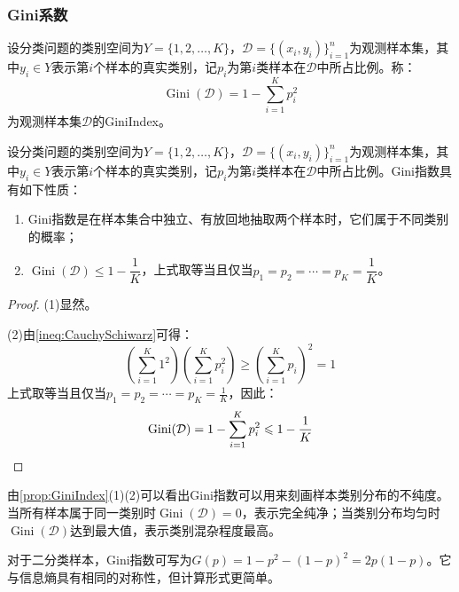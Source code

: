 \subsubsection{Gini系数}
\begin{definition}
	设分类问题的类别空间为$Y=\{1,2,\dots,K\}$，$\mathcal{D}=\{(x_i,y_i)\}_{i=1}^n$为观测样本集，其中$y_i\in Y$表示第$i$个样本的真实类别，记$p_i$为第$i$类样本在$\mathcal{D}$中所占比例。称：
	\begin{equation*}
		\operatorname{Gini}(\mathcal{D})=1-\sum_{i=1}^Kp_i^2
	\end{equation*}
	为观测样本集$\mathcal{D}$的\gls{GiniIndex}。
\end{definition}
\begin{property}\label{prop:GiniIndex}
	设分类问题的类别空间为$Y=\{1,2,\dots,K\}$，$\mathcal{D}=\{(x_i,y_i)\}_{i=1}^n$为观测样本集，其中$y_i\in Y$表示第$i$个样本的真实类别，记$p_i$为第$i$类样本在$\mathcal{D}$中所占比例。Gini指数具有如下性质：
	\begin{enumerate}
		\item Gini指数是在样本集合中独立、有放回地抽取两个样本时，它们属于不同类别的概率；
		\item $\operatorname{Gini}(\mathcal{D})\leqslant1-\dfrac{1}{K}$，上式取等当且仅当$p_1=p_2=\cdots=p_K=\dfrac{1}{K}$。
	\end{enumerate}
\end{property}
\begin{proof}
	(1)显然。\par
	(2)由\cref{ineq:CauchySchiwarz}可得：
	\begin{equation*}
			\left(\sum_{i=1}^{K}1^2\right)\left(\sum_{i=1}^{K}p_i^2\right)\geqslant\left(\sum_{i=1}^{K}p_i\right)^2=1
	\end{equation*}
	上式取等当且仅当$p_1=p_2=\cdots=p_K=\frac{1}{K}$，因此：
	\begin{equation*}
		\operatorname{Gini}(\mathcal{D})=1-\sum_{i=1}^{K}p_i^2\leqslant1-\frac{1}{K}\qedhere
	\end{equation*}
\end{proof}
\begin{note}
	由\cref{prop:GiniIndex}(1)(2)可以看出Gini指数可以用来刻画样本类别分布的不纯度。当所有样本属于同一类别时$\operatorname{Gini}(\mathcal{D})=0$，表示完全纯净；当类别分布均匀时$\operatorname{Gini}(\mathcal{D})$达到最大值，表示类别混杂程度最高。
\end{note}
对于二分类样本，Gini指数可写为$G(p)=1-p^2-(1-p)^2=2p(1-p)$。它与信息熵具有相同的对称性，但计算形式更简单。
